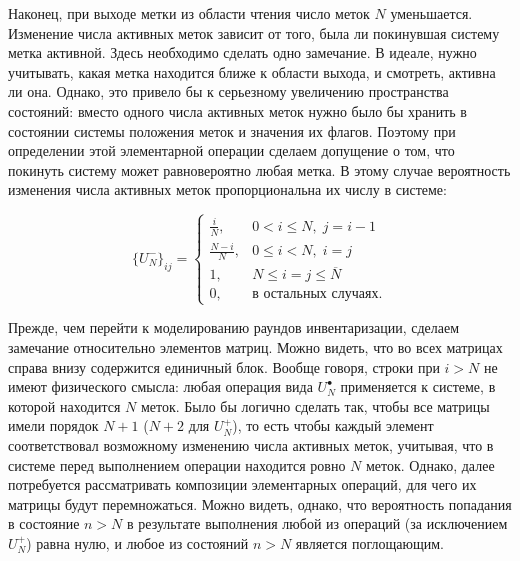 Наконец, при выходе метки из области чтения число меток $N$ уменьшается. Изменение числа активных меток зависит от того, была ли покинувшая систему метка активной. Здесь необходимо сделать одно замечание. В идеале, нужно учитывать, какая метка находится ближе к области выхода, и смотреть, активна ли она. Однако, это привело бы к серьезному увеличению пространства состояний: вместо одного числа активных меток нужно было бы хранить в состоянии системы положения меток и значения их флагов. Поэтому при определении этой элементарной операции сделаем допущение о том, что покинуть систему может равновероятно любая метка. В этому случае вероятность изменения числа активных меток пропорциональна их числу в системе:

\begin{equation}\label{eq:ch3_bg_tag_departure}
	\{ U_{N}^- \}_{ij} = \begin{cases}
		\frac{i}{N},     & 0 < i \leqslant N,\; j = i - 1\\
		\frac{N - i}{N}, & 0 \leqslant i < N,\; i = j\\
		1,               & N \leqslant i = j \leqslant \overline{N}\\
		0,               & \text{в остальных случаях.}
 	\end{cases}
\end{equation}

Прежде, чем перейти к моделированию раундов инвентаризации, сделаем замечание относительно элементов матриц. Можно видеть, что во всех матрицах справа внизу содержится единичный блок. Вообще говоря, строки при $i > N$ не имеют физического смысла: любая операция вида $U^\bullet_N$ применяется к системе, в которой находится $N$ меток. Было бы логично сделать так, чтобы все матрицы имели порядок $N+1$ ($N+2$ для $U_N^+$), то есть чтобы каждый элемент соответствовал возможному изменению числа активных меток, учитывая, что в системе перед выполнением операции находится ровно $N$ меток. Однако, далее потребуется рассматривать композиции элементарных операций, для чего их матрицы будут перемножаться. Можно видеть, однако, что вероятность попадания в состояние $n > N$ в результате выполнения любой из операций (за исключением $U_N^+$) равна нулю, и любое из состояний $n > N$ является поглощающим.




